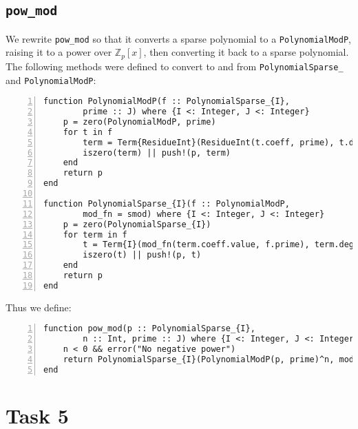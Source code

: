 \documentclass{article}
\theoremstyle{plain}
\numberwithin{theorem}{section}
\numberwithin{example}{section}
\theoremstyle{definition}
\numberwithin{definition}{section}
\begin{document}
\bigbreak

\subsection{\texttt{pow\_mod}}
We rewrite \texttt{pow\_mod} so that it converts a sparse polynomial to a
\texttt{PolynomialModP}, raising it to a power over $\mathbb{Z}_p[x]$, then
converting it back to a sparse polynomial. The following methods were defined to
convert to and from \texttt{PolynomialSparse\_} and
\texttt{PolynomialModP}:

\begin{codebox}
    \begin{Verbatim}[numbers=left,xleftmargin=5mm]
function PolynomialModP(f :: PolynomialSparse_{I},
        prime :: J) where {I <: Integer, J <: Integer}
    p = zero(PolynomialModP, prime)
    for t in f
        term = Term{ResidueInt}(ResidueInt(t.coeff, prime), t.degree)
        iszero(term) || push!(p, term)
    end
    return p
end

function PolynomialSparse_{I}(f :: PolynomialModP,
        mod_fn = smod) where {I <: Integer, J <: Integer}
    p = zero(PolynomialSparse_{I})
    for term in f
        t = Term{I}(mod_fn(term.coeff.value, f.prime), term.degree)
        iszero(t) || push!(p, t)
    end
    return p
end
    \end{Verbatim}
\end{codebox}

Thus we define:

\begin{codebox}
    \begin{Verbatim}[numbers=left,xleftmargin=5mm]
function pow_mod(p :: PolynomialSparse_{I},
        n :: Int, prime :: J) where {I <: Integer, J <: Integer}
    n < 0 && error("No negative power")
    return PolynomialSparse_{I}(PolynomialModP(p, prime)^n, mod)
end
    \end{Verbatim}
\end{codebox}


\bigbreak

\section{Task 5} \label{crt}
\end{document}
